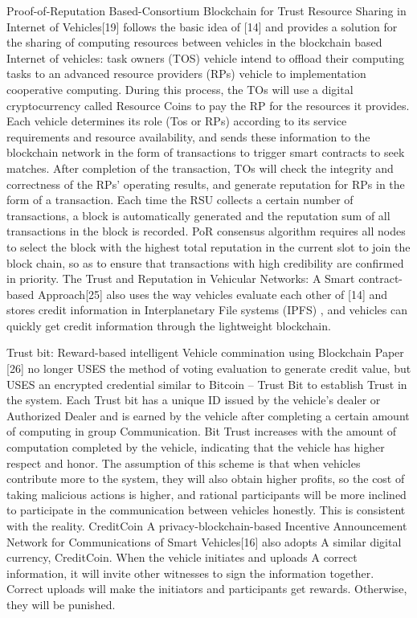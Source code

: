 Proof-of-Reputation Based-Consortium Blockchain for Trust Resource Sharing in Internet of Vehicles[19] follows the basic idea of [14] and provides a solution for the sharing of computing resources between vehicles in the blockchain based Internet of vehicles: task owners (TOS) vehicle intend to offload their computing tasks to an advanced resource providers (RPs) vehicle to implementation cooperative computing. During this process, the TOs will use a digital cryptocurrency called Resource Coins to pay the RP for the resources it provides. Each vehicle determines its role (Tos or RPs) according to its service requirements and resource availability, and sends these information to the blockchain network in the form of transactions to trigger smart contracts to seek matches. After completion of the transaction, TOs will check the integrity and correctness of the RPs' operating results, and generate reputation for RPs in the form of a transaction. Each time the RSU collects a certain number of transactions, a block is automatically generated and the reputation sum of all transactions in the block is recorded. PoR consensus algorithm requires all nodes to select the block with the highest total reputation in the current slot to join the block chain, so as to ensure that transactions with high credibility are confirmed in priority. The Trust and Reputation in Vehicular Networks: A Smart contract-based Approach[25] also uses the way vehicles evaluate each other of [14] and stores credit information in Interplanetary File systems (IPFS) , and vehicles can quickly get credit information through the lightweight blockchain.

Trust bit: Reward-based intelligent Vehicle commination using Blockchain Paper [26] no longer USES the method of voting evaluation to generate credit value, but USES an encrypted credential similar to Bitcoin -- Trust Bit to establish Trust in the system. Each Trust bit has a unique ID issued by the vehicle's dealer or Authorized Dealer and is earned by the vehicle after completing a certain amount of computing in group Communication. Bit Trust increases with the amount of computation completed by the vehicle, indicating that the vehicle has higher respect and honor. The assumption of this scheme is that when vehicles contribute more to the system, they will also obtain higher profits, so the cost of taking malicious actions is higher, and rational participants will be more inclined to participate in the communication between vehicles honestly. This is consistent with the reality. CreditCoin A privacy-blockchain-based Incentive Announcement Network for Communications of Smart Vehicles[16] also adopts A similar digital currency, CreditCoin. When the vehicle initiates and uploads A correct information, it will invite other witnesses to sign the information together. Correct uploads will make the initiators and participants get rewards. Otherwise, they will be punished.

